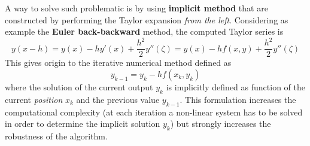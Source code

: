 		A way to solve such problematic is by using \textbf{implicit method} that are constructed by performing the Taylor expansion \textit{from the left}. Considering as example the \textbf{Euler back-backward} method, the computed Taylor series is
		\[ y(x-h) = y(x) - h y'(x) + \frac{h^2}{2} y''(\zeta) = y(x) - h f(x,y) + \frac{h^2}{2} y''(\zeta) \] 
		This gives origin to the iterative numerical method defined as
		\[ y_{k-1} = y_k - h f(x_k,y_k)  \]
		where the solution of the current output $y_k$ is implicitly defined as function of the current \textit{position} $x_k$ and the previous value $y_{k-1}$. This formulation increases the computational complexity (at each iteration a non-linear system has to be solved in order to determine the implicit solution $y_k$) but strongly increases the robustness of the algorithm.
	
	
	
	
	
	
	
	
	
	
	
	
	
	
	
	
	
	
	
	
	
	
	
	
	
	
	
	
	
	
	